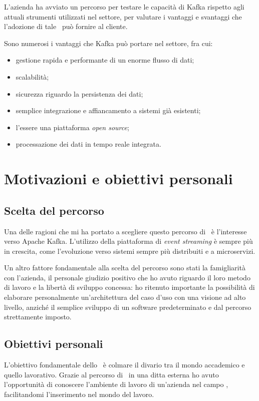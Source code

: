 L'azienda ha avviato un percorso per testare le capacità di Kafka rispetto agli attuali strumenti utilizzati nel settore, per valutare i vantaggi e svantaggi che l'adozione di tale \software\ può fornire al cliente.

\noindent
Sono numerosi i vantaggi che Kafka può portare nel settore, fra cui:
\begin{itemize}
  \item gestione rapida e performante di un enorme flusso di dati;
  \item scalabilità;
  \item sicurezza riguardo la persistenza dei dati;
  \item semplice integrazione e affiancamento a sistemi già esistenti;
  \item l'essere una piattaforma \textit{open source};
  \item processazione dei dati in tempo reale integrata.
\end{itemize}


\section{Motivazioni e obiettivi personali}

\subsection{Scelta del percorso}

Una delle ragioni che mi ha portato a scegliere questo percorso di \stage\ è l'interesse verso Apache Kafka.
L'utilizzo della piattaforma di \textit{event streaming} è sempre più in crescita, come l'evoluzione verso sistemi sempre più distribuiti e a microservizi.

Un altro fattore fondamentale alla scelta del percorso sono stati la famigliarità con l'azienda, il personale giudizio positivo che ho avuto riguardo il loro metodo di lavoro e la libertà di sviluppo concessa: ho ritenuto importante la possibilità di elaborare personalmente un'architettura del caso d'uso con una visione ad alto livello, anziché il semplice sviluppo di un software predeterminato e dal percorso strettamente imposto.

\subsection{Obiettivi personali}
L'obiettivo fondamentale dello \stage\ è colmare il divario tra il mondo accademico e quello lavorativo.
Grazie al percorso di \stage\ in una ditta esterna ho avuto l'opportunità di conoscere l'ambiente di lavoro di un'azienda nel campo , facilitandomi l'inserimento nel mondo del lavoro.

